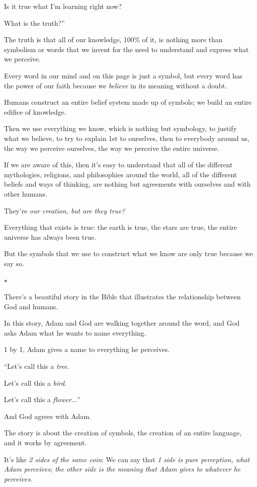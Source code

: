 \documentclass{article}
\numberwithin{equation}{section}
\begin{document}
Is it true what I'm learning right now?

What is the truth?''

%
The truth is that all of our knowledge, 100\% of it, is nothing more than symbolism or words that we invent for the need to understand and express what we perceive.

Every word in our mind and on this page is just a symbol, but every word has the power of our faith because we \textit{believe} in its meaning without a doubt.

Humans construct an entire belief system made up of symbols; we build an entire edifice of knowledge.

Then we use everything we know, which is nothing but symbology, to justify what we believe, to try to explain 1st to ourselves, then to everybody around us, the way we perceive ourselves, the way we perceive the entire universe.

If we are aware of this, then it's easy to understand that all of the different mythologies, religions, and philosophies around the world, all of the different beliefs and ways of thinking, are nothing but agreements with ourselves and with other humans.

They're \textit{our creation, but are they true?}

Everything that exists is true: the earth is true, the stars are true, the entire universe has always been true.

But the symbols that we use to construct what we know are only true because we say so.
\begin{center}
    $\star$
\end{center}

There's a beautiful story in the Bible that illustrates the relationship between God and humans.

In this story, Adam and God are walking together around the word, and God asks Adam what he wants to name everything.

1 by 1, Adam gives a name to everything he perceives.

``Let's call this a \textit{tree}.

Let's call this a \textit{bird}.

Let's call this a \textit{flower}$\ldots$''

And God agrees with Adam.

The story is about the creation of symbols, the creation of an entire language, and it works by agreement.

It's like \textit{2 sides of the same coin}: We can say that \textit{1 side is pure perception, what Adam perceives; the other side is the meaning that Adam gives to whatever he perceives}.
\end{document}
